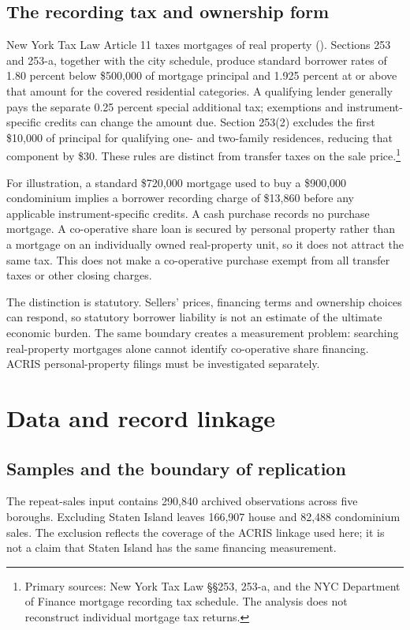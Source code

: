 \documentclass[12pt]{article}
\begin{document}
\subsection{The recording tax and ownership form}
New York Tax Law Article 11 taxes mortgages of real property (\citealp{nytaxlaw,nycmrt2026}). Sections 253 and 253-a, together with the city schedule, produce standard borrower rates of 1.80 percent below \$500,000 of mortgage principal and 1.925 percent at or above that amount for the covered residential categories. A qualifying lender generally pays the separate 0.25 percent special additional tax; exemptions and instrument-specific credits can change the amount due. Section 253(2) excludes the first \$10,000 of principal for qualifying one- and two-family residences, reducing that component by \$30. These rules are distinct from transfer taxes on the sale price.\footnote{Primary sources: New York Tax Law \S\S253, 253-a, and the NYC Department of Finance mortgage recording tax schedule. The analysis does not reconstruct individual mortgage tax returns.}

For illustration, a standard \$720,000 mortgage used to buy a \$900,000 condominium implies a borrower recording charge of \$13,860 before any applicable instrument-specific credits. A cash purchase records no purchase mortgage. A co-operative share loan is secured by personal property rather than a mortgage on an individually owned real-property unit, so it does not attract the same tax. This does not make a co-operative purchase exempt from all transfer taxes or other closing charges.

The distinction is statutory. Sellers' prices, financing terms and ownership choices can respond, so statutory borrower liability is not an estimate of the ultimate economic burden. The same boundary creates a measurement problem: searching real-property mortgages alone cannot identify co-operative share financing. ACRIS personal-property filings must be investigated separately.

\section{Data and record linkage}
\subsection{Samples and the boundary of replication}
The repeat-sales input contains 290,840 archived observations across five boroughs. Excluding Staten Island leaves 166,907 house and 82,488 condominium sales. The exclusion reflects the coverage of the ACRIS linkage used here; it is not a claim that Staten Island has the same financing measurement.
\end{document}
